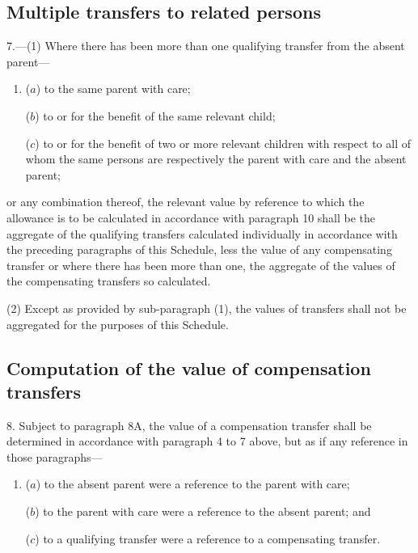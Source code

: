\documentclass[12pt,a4paper]{article}
\begin{document}

\subsection*{Multiple transfers to related persons}

7.—(1) Where there has been more than one qualifying transfer from the absent parent—
\begin{enumerate}\item[]
($a$) to the same parent with care;

($b$) to or for the benefit of the same relevant child;

($c$) to or for the benefit of two or more relevant children with respect to all of whom the same persons are respectively the parent with care and the absent parent;
\end{enumerate}
or any combination thereof, the relevant value by reference to which the allowance is to be calculated in accordance with paragraph 10 shall be the aggregate of the qualifying transfers calculated individually in accordance with the preceding paragraphs of this Schedule, less the value of any compensating transfer or where there has been more than one, the aggregate of the values of the compensating transfers so calculated.

(2) Except as provided by sub-paragraph (1), the values of transfers shall not be aggregated for the purposes of this Schedule.

\subsection*{Computation of the value of compensation transfers}

8.  
Subject to paragraph 8A, the value of  %
a compensation transfer shall be determined in accordance with paragraph 4 to 7 above, but as if any reference in those paragraphs—
\begin{enumerate}\item[]
($a$) to the absent parent were a reference to the parent with care;

($b$) to the parent with care were a reference to the absent parent; and

($c$) to a qualifying transfer were a reference to a compensating transfer.
\end{enumerate}
\end{document}
